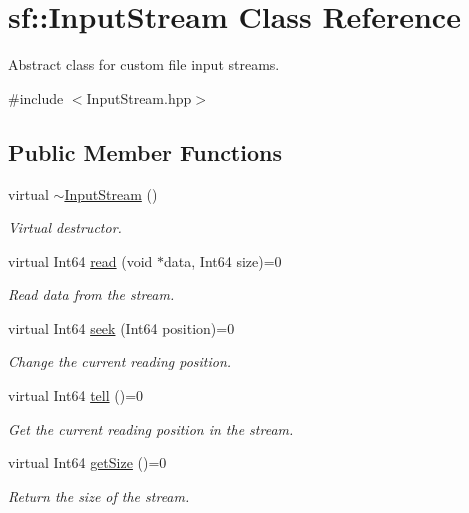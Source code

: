 \hypertarget{classsf_1_1_input_stream}{\section{sf\+:\+:Input\+Stream Class Reference}
\label{classsf_1_1_input_stream}
}


Abstract class for custom file input streams.  




{\ttfamily \#include $<$Input\+Stream.\+hpp$>$}

\subsection*{Public Member Functions}
\begin{DoxyCompactItemize}
\item 
\hypertarget{classsf_1_1_input_stream_a4b2eb0f92323e630bd0542bc6191682e}{virtual \hyperlink{classsf_1_1_input_stream_a4b2eb0f92323e630bd0542bc6191682e}{$\sim$\+Input\+Stream} ()}\label{classsf_1_1_input_stream_a4b2eb0f92323e630bd0542bc6191682e}

\begin{DoxyCompactList}\small\item\em Virtual destructor. \end{DoxyCompactList}\item 
virtual Int64 \hyperlink{classsf_1_1_input_stream_a8dd89c74c1acb693203f50e750c6ae53}{read} (void $\ast$data, Int64 size)=0
\begin{DoxyCompactList}\small\item\em Read data from the stream. \end{DoxyCompactList}\item 
virtual Int64 \hyperlink{classsf_1_1_input_stream_a76aba8e5d5cf9b1c5902d5e04f7864fc}{seek} (Int64 position)=0
\begin{DoxyCompactList}\small\item\em Change the current reading position. \end{DoxyCompactList}\item 
virtual Int64 \hyperlink{classsf_1_1_input_stream_a599515b9ccdbddb6fef5a98424fd559c}{tell} ()=0
\begin{DoxyCompactList}\small\item\em Get the current reading position in the stream. \end{DoxyCompactList}\item 
virtual Int64 \hyperlink{classsf_1_1_input_stream_a311eaaaa65d636728e5153b574b72d5d}{get\+Size} ()=0
\begin{DoxyCompactList}\small\item\em Return the size of the stream. \end{DoxyCompactList}\end{DoxyCompactItemize}


